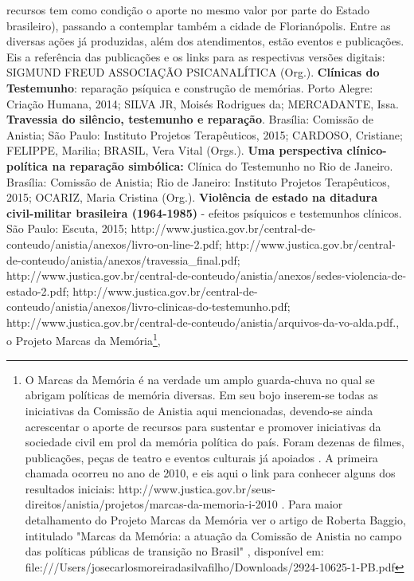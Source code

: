 {  recursos tem como condição o aporte no mesmo valor por parte do Estado
  brasileiro), passando a contemplar também a cidade de Florianópolis.
  Entre as diversas ações já produzidas, além dos atendimentos, estão
  eventos e publicações. Eis a referência das publicações e os links
  para as respectivas versões digitais: SIGMUND FREUD ASSOCIAÇÃO
  PSICANALÍTICA (Org.). \textbf{Clínicas do Testemunho}: reparação
  psíquica e construção de memórias. Porto Alegre: Criação Humana, 2014;
  SILVA JR, Moisés Rodrigues da; MERCADANTE, Issa. \textbf{Travessia do
  silêncio, testemunho e reparação}. Brasília: Comissão de Anistia; São
  Paulo: Instituto Projetos Terapêuticos, 2015; CARDOSO, Cristiane;
  FELIPPE, Marilia; BRASIL, Vera Vital (Orgs.). \textbf{Uma perspectiva
  clínico-política na reparação simbólica:} Clínica do Testemunho no Rio
  de Janeiro. Brasília: Comissão de Anistia; Rio de Janeiro: Instituto
  Projetos Terapêuticos, 2015; OCARIZ, Maria Cristina (Org.).
  \textbf{Violência de estado na ditadura civil-militar brasileira
  (1964-1985)} - efeitos psíquicos e testemunhos clínicos. São Paulo:
  Escuta, 2015;
  http://www.justica.gov.br/central-de-conteudo/anistia/anexos/livro-on-line-2.pdf;
  http://www.justica.gov.br/central-de-conteudo/anistia/anexos/travessia\_final.pdf;
  http://www.justica.gov.br/central-de-conteudo/anistia/anexos/sedes-violencia-de-estado-2.pdf;
  http://www.justica.gov.br/central-de-conteudo/anistia/anexos/livro-clinicas-do-testemunho.pdf;
  http://www.justica.gov.br/central-de-conteudo/anistia/arquivos-da-vo-alda.pdf.},
o Projeto Marcas da Memória\footnote{O Marcas da Memória é na verdade um
  amplo guarda-chuva no qual se abrigam políticas de memória diversas.
  Em seu bojo inserem-se todas as iniciativas da Comissão de Anistia
  aqui mencionadas, devendo-se ainda acrescentar o aporte de recursos
  para sustentar e promover iniciativas da sociedade civil em prol da
  memória política do país. Foram dezenas de filmes, publicações, peças
  de teatro e eventos culturais já apoiados . A primeira chamada ocorreu
  no ano de 2010, e eis aqui o link para conhecer alguns dos resultados
  iniciais:
  http://www.justica.gov.br/seus-direitos/anistia/projetos/marcas-da-memoria-i-2010
  . Para maior detalhamento do Projeto Marcas da Memória ver o artigo de
  Roberta Baggio, intitulado "Marcas da Memória: a atuação da Comissão
  de Anistia no campo das políticas públicas de transição no Brasil" ,
  disponível em:
  file:///Users/josecarlosmoreiradasilvafilho/Downloads/2924-10625-1-PB.pdf},
